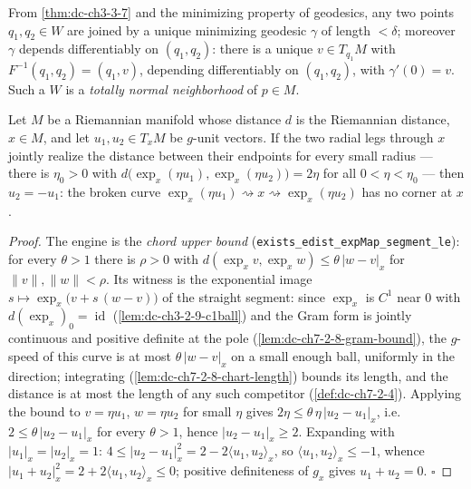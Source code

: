 \begin{remark}
  \label{rem:dc-ch3-3-8}
  From \cref{thm:dc-ch3-3-7} and the minimizing property of geodesics, any two points
  $q_1,q_2\in W$ are joined by a unique minimizing geodesic $\gamma$ of length
  $<\delta$; moreover $\gamma$ depends differentiably on $(q_1,q_2)$: there is a
  unique $v\in T_{q_1}M$ with $F^{-1}(q_1,q_2)=(q_1,v)$, depending differentiably on
  $(q_1,q_2)$, with $\gamma'(0)=v$. Such a $W$ is a \emph{totally normal neighborhood} of
  $p\in M$.
\end{remark}

\begin{lemma}
  \label{lem:dc-ch3-3-9-corner}
  \leanok
  Let $M$ be a Riemannian manifold whose distance $d$ is the Riemannian
  distance, $x\in M$, and let $u_1,u_2\in T_xM$ be $g$-unit vectors. If the
  two radial legs through $x$ jointly realize the distance between their
  endpoints for every small radius — there is $\eta_0>0$ with
  $d\big(\exp_x(\eta u_1),\exp_x(\eta u_2)\big)=2\eta$ for all
  $0<\eta<\eta_0$ — then $u_2=-u_1$: the broken curve
  $\exp_x(\eta u_1)\rightsquigarrow x\rightsquigarrow\exp_x(\eta u_2)$ has no
  corner at $x$.
\end{lemma}
\begin{proof}
  \leanok
  The engine is the \emph{chord upper bound}
  (\texttt{exists\_edist\_expMap\_segment\_le}): for every $\theta>1$ there
  is $\rho>0$ with $d(\exp_x v,\exp_x w)\le\theta\,|w-v|_x$ for
  $\|v\|,\|w\|<\rho$. Its witness is the exponential image
  $s\mapsto\exp_x\big(v+s\,(w-v)\big)$ of the straight segment: since
  $\exp_x$ is $C^1$ near $0$ with $d(\exp_x)_0=\operatorname{id}$
  (\cref{lem:dc-ch3-2-9-c1ball}) and the Gram form is jointly continuous
  and positive definite at the pole (\cref{lem:dc-ch7-2-8-gram-bound}), the
  $g$-speed of this curve is at most $\theta\,|w-v|_x$ on a small enough
  ball, uniformly in the direction; integrating
  (\cref{lem:dc-ch7-2-8-chart-length}) bounds its length, and the distance
  is at most the length of any such competitor (\cref{def:dc-ch7-2-4}).
  Applying the bound to $v=\eta u_1$, $w=\eta u_2$ for small $\eta$ gives
  $2\eta\le\theta\,\eta\,|u_2-u_1|_x$, i.e. $2\le\theta\,|u_2-u_1|_x$ for
  every $\theta>1$, hence $|u_2-u_1|_x\ge2$. Expanding with
  $|u_1|_x=|u_2|_x=1$:
  $4\le|u_2-u_1|_x^2=2-2\langle u_1,u_2\rangle_x$, so
  $\langle u_1,u_2\rangle_x\le-1$, whence
  $|u_1+u_2|_x^2=2+2\langle u_1,u_2\rangle_x\le0$; positive definiteness of
  $g_x$ gives $u_1+u_2=0$. $\square$
\end{proof}

